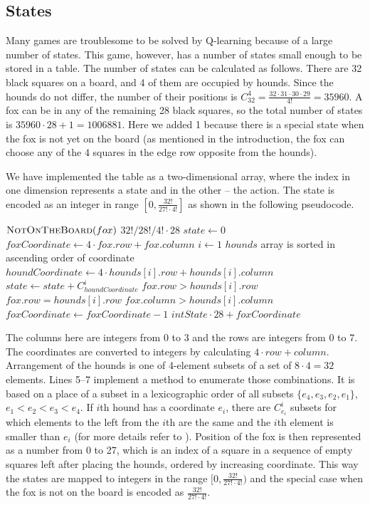 \documentclass[a4paper]{article}
\begin{document}
\subsection{States} \label{states}
Many games are troublesome to be solved by Q-learning because of a large number
of states. This game, however, has a number of states small enough to be stored
in a table. The number of states can be calculated as follows. There are 32
black squares on a board, and 4 of them are occupied by hounds. Since the
hounds do not differ, the number of their positions is $C_{32}^4 = \frac{32
\cdot 31 \cdot 30 \cdot 29}{4!} = 35960$. A fox can be in any of the remaining
28 black squares, so the total number of states is $35960 \cdot 28 + 1 =
1006881$. Here we added 1 because there is a special state when the fox is not
yet on the board (as mentioned in the introduction, the fox can choose any of
the 4 squares in the edge row opposite from the hounds).

We have implemented the table as a two-dimensional array, where the index in
one dimension represents a state and in the other -- the action. The state is
encoded as an integer in range $[0, \frac{32!}{27! \cdot 4!}]$ as shown in the
following pseudocode.

\begin{codebox}
    \li \If $\textnormal{\scshape NotOnTheBoard}(fox)$
    \li     \Then \Return $32! / 28! / 4! \cdot 28$
        \End
    \li $state \gets 0$
    \li $foxCoordinate \gets 4 \cdot fox.row + fox.column$
    \li \For $i \gets 1$  \>\>\>\>\> \Comment $hounds$ array is sorted in
                                                   ascending order of coordinate
    \li \Do $houndCoordinate \gets 4 \cdot hounds[i].row + hounds[i].column$
    \li     $state \gets state + C_{houndCoordinate}^i$
    \li     \If $fox.row > hounds[i].row$ 
    \li \>\> $fox.row = hounds[i].row$  $fox.column > hounds[i].column$
    \li         \Then $foxCoordinate \gets foxCoordinate - 1$
            \End
        \End
    \li \Return $intState \cdot 28 + foxCoordinate$
    \End
\end{codebox}

The columns here are integers from 0 to 3 and the rows are integers from 0 to 7.
The coordinates are converted to integers by calculating $4 \cdot row +
column$. Arrangement of the hounds is one of 4-element subsets of a set of $8
\cdot 4 = 32$ elements. Lines 5--7 implement a method to enumerate those
combinations. It is based on a place of a subset in a lexicographic order of all
subsets $\{e_4, e_3, e_2, e_1\}$, $e_1 < e_2 < e_3 < e_4$. If $i$th hound has
a coordinate $e_i$, there are $C_{e_i}^i$ subsets for which elements to the
left from the $i$th are the same and the $i$th element is smaller than $e_i$
(for more details refer to \cite{knuth02}). Position of the fox is then
represented as a number from 0 to 27, which is an index of a square in a
sequence of empty squares left after placing the hounds, ordered by increasing
coordinate. This way the states are mapped to integers in the range $[0,
\frac{32!}{27! \cdot 4!})$ and the special case when the fox is not on the
board is encoded as $\frac{32!}{27!  \cdot 4!}$.
\end{document}
